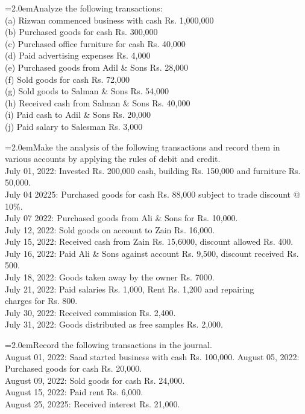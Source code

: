 \documentclass[11pt,a4paper]{article}
\newcommand{\lqn}[2]{\Needspace{6\baselineskip}\par\medskip\noindent\hangindent=2.0em\hangafter=1\makebox[2.0em][l]{\textbf{#1.}}#2\par}
\begin{document}
\lqn{8}{Analyze the following transactions:\\
(a) Rizwan commenced business with cash Rs. 1,000,000\\
(b) Purchased goods for cash Rs. 300,000\\
(c) Purchased office furniture for cash Rs. 40,000\\
(d) Paid advertising expenses Rs. 4,000\\
(e) Purchased goods from Adil \& Sons Rs. 28,000\\
(f) Sold goods for cash Rs. 72,000\\
(g) Sold goods to Salman \& Sons Rs. 54,000\\
(h) Received cash from Salman \& Sons Rs. 40,000\\
(i) Paid cash to Adil \& Sons Rs. 20,000\\
(j) Paid salary to Salesman Rs. 3,000\par
}
\lqn{9}{Make the analysis of the following transactions and record them in various accounts by applying the rules of debit and credit.\\
July 01, 2022: Invested Rs. 200,000 cash, building Rs. 150,000 and furniture Rs. 50,000.\\
July 04 20225: Purchased goods for cash Rs. 88,000 subject to trade discount @ 10\%.\\
July 07 2022: Purchased goods from Ali \& Sons for Rs. 10,000.\\
July 12, 2022: Sold goods on account to Zain Rs. 16,000.\\
July 15, 2022: Received cash from Zain Rs. 15,6000, discount allowed Rs. 400.\\
July 16, 2022: Paid Ali \& Sons against account Rs. 9,500, discount received Rs. 500.\\
July 18, 2022: Goods taken away by the owner Rs. 7000.\\
July 21, 2022: Paid salaries Rs. 1,000, Rent Rs. 1,200 and repairing\\
charges for Rs. 800.\\
July 30, 2022: Received commission Rs. 2,400.\\
July 31, 2022: Goods distributed as free samples Rs. 2,000.\par
}
\lqn{10}{Record the following transactions in the journal.\\
August 01, 2022:           Saad started business with cash Rs. 100,000. August 05, 2022:           Purchased goods for cash Rs. 20,000.\\
August 09, 2022:           Sold goods for cash Rs. 24,000.\\
August 15, 2022:           Paid rent Rs. 6,000.\\
August 25, 20225:           Received interest Rs. 21,000.\par
}
\end{document}
